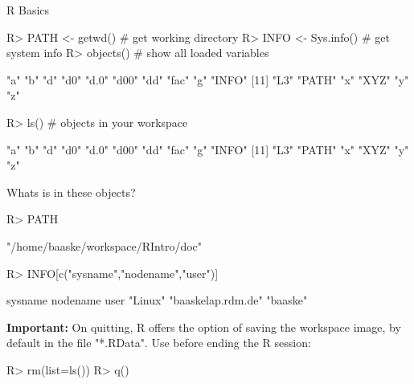 \documentclass[10pt]{beamer}
\let\proglang=\textsf
\begin{document}
\begin{frame}[fragile]{\proglang{R} Basics}
\begin{Schunk}
\begin{Sinput}
R> PATH <- getwd()        # get working directory
R> INFO <- Sys.info()     # get system info  
R> objects()              # show all loaded variables
\end{Sinput}
\begin{Soutput}
 [1] "a"    "b"    "d"    "d0"   "d.0"  "d00"  "dd"   "fac"  "g"    "INFO"
[11] "L3"   "PATH" "x"    "XYZ"  "y"    "z"   
\end{Soutput}
\begin{Sinput}
R> ls()                   # objects in your workspace
\end{Sinput}
\begin{Soutput}
 [1] "a"    "b"    "d"    "d0"   "d.0"  "d00"  "dd"   "fac"  "g"    "INFO"
[11] "L3"   "PATH" "x"    "XYZ"  "y"    "z"   
\end{Soutput}
\end{Schunk}
Whats is in these objects?
\begin{Schunk}
\begin{Sinput}
R> PATH
\end{Sinput}
\begin{Soutput}
[1] "/home/baaske/workspace/RIntro/doc"
\end{Soutput}
\begin{Sinput}
R> INFO[c("sysname","nodename","user")]
\end{Sinput}
\begin{Soutput}
           sysname           nodename               user 
           "Linux" "baaskelap.rdm.de"           "baaske" 
\end{Soutput}
\end{Schunk}
\textbf{Important:} On quitting, R offers the option of saving the workspace
image, by default in the file "*.RData". Use before ending the R session:
\begin{Schunk}
\begin{Sinput}
R> rm(list=ls())
R> q()
\end{Sinput}
\end{Schunk}
\end{frame}
%
\end{document}
